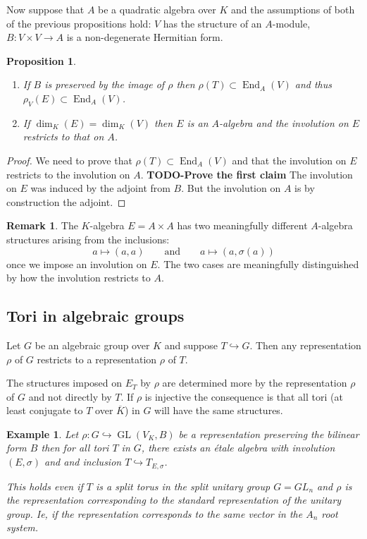 \documentclass{article}
\theoremstyle{plain}
\newtheorem{proposition}[theorem]{Proposition}
\newtheorem{example}[theorem]{Example}
\theoremstyle{definition}
\newtheorem{remark}[theorem]{Remark}
\numberwithin{equation}{section}
\DeclareMathOperator{\End}{End}
\DeclareMathOperator{\GL}{GL}
\newcommand{\TODO}[1]{\textbf{TODO-#1}}
\begin{document}
Now suppose that $A$ be a quadratic algebra over $K$ and the assumptions of both of the previous propositions hold: $V$ has the structure of an $A$-module,  $B : V \times V \rightarrow A$ is a non-degenerate Hermitian form.

\begin{proposition}
\begin{enumerate}
\item If $B$ is preserved by the image of $\rho$ then $\rho(T) \subset \End_A(V)$ and thus $\rho_V(E) \subset \End_A(V)$.
\item If $\dim_K(E) = \dim_K(V)$ then $E$ is an $A$-algebra and the involution on $E$ restricts to that on $A$.
\end{enumerate}
\end{proposition}
\begin{proof}
We need to prove that $\rho(T) \subset \End_A(V)$ and that the involution on $E$ restricts to the involution on $A$.
\TODO{Prove the first claim}
The involution on $E$ was induced by the adjoint from $B$. But the involution on $A$ is by construction the adjoint.
\end{proof}
\begin{remark}
The $K$-algebra $E= A\times A$ has two meaningfully different $A$-algebra structures arising from the inclusions:
\[ a \mapsto (a,a) \qquad \text{and}\qquad a\mapsto (a,\sigma(a)) \]
once we impose an involution on $E$. The two cases are meaningfully distinguished by how the involution restricts to $A$.
\end{remark}


\subsection{Tori in algebraic groups}

Let $G$ be an algebraic group over $K$ and suppose $T \hookrightarrow G$.
Then any representation $\rho$ of $G$ restricts to a representation $\rho$ of $T$.

The structures imposed on $E_T$ by $\rho$ are determined more by the representation $\rho$ of $G$ and not directly by $T$. If $\rho$ is injective the consequence is that all tori (at least conjugate to $T$ over $\overline{K}$) in $G$ will have the same structures.

\begin{example}
Let $\rho:G \hookrightarrow \GL(V_K,B)$ be a representation preserving the bilinear form $B$ then for all tori $T$ in $G$, there exists an \'etale algebra with involution $(E,\sigma)$ and and inclusion $T \hookrightarrow T_{E,\sigma}$.

This holds even if $T$ is a split torus in the split unitary group $G=GL_n$ and $\rho$ is the representation corresponding to the standard representation of the unitary group. Ie, if the representation corresponds to the same vector in the $A_n$ root system.
\end{example}
\end{document}
